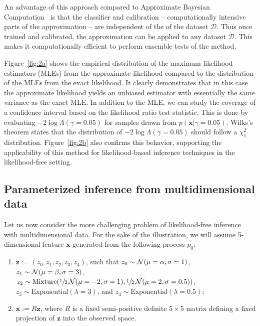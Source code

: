 \documentclass[12pt]{article}
\numberwithin{equation}{section}
\theoremstyle{plain}
\begin{document}
An advantage of this approach compared to Approximate Bayesian Computation~\citep{beaumont2002approximate} is that the
classifier and calibration -- computationally intensive
parts of the approximation  -- are independent of the of the dataset $\mathcal{D}$.
Thus once trained and calibrated, the approximation can be applied to any dataset $\mathcal{D}$.
This makes it computationally efficient to perform ensemble tests of the method.

Figure~\ref{fig:2a} shows the empirical distribution of the maximum likelihood estimators (MLEs) from the
approximate likelihood compared to the distribution of the MLEs from the exact likelihood.
It clearly demonstrates that in this case the approximate likelihood yields an unbiased estimator with essentially the same variance as the exact MLE.
In addition to the MLE, we can study the coverage of a confidence interval based on the likelihood ratio test statistic.
This is done by evaluating $-2\log \Lambda(\gamma=0.05)$ for samples drawn from $p(\mathbf{x} | \gamma=0.05)$.
Wilks's theorem states that the distribution of $-2\log \Lambda(\gamma=0.05)$ should follow a $\chi^2_1$ distribution.
%
Figure~\ref{fig:2b} also confirms this behavior, supporting the applicability of this method for likelihood-based inference techniques in the likelihood-free setting.




\subsection{Parameterized inference from multidimensional data}

Let us now consider the more challenging problem of likelihood-free
inference with multidimensional data.
For the sake of the illustration, we will assume 5-dimensional feature $\mathbf{x}$ generated
from the following process $p_0$:
    \begin{enumerate}
        \item $\mathbf{z} := (z_0, z_1, z_2, z_3, z_4)$, such that
            $z_0 \sim {\cal N}(\mu=\alpha, \sigma=1)$,
            $z_1 \sim {\cal N}(\mu=\beta, \sigma=3)$,
            $z_2 \sim {\text{Mixture}}(\sfrac{1}{2}\,{\cal N}(\mu=-2, \sigma=1), \sfrac{1}{2}\,{\cal N}(\mu=2, \sigma=0.5))$,
            $z_3 \sim {\text{Exponential}(\lambda=3)}$, and
            $z_4 \sim {\text{Exponential}(\lambda=0.5)}$;
        \item $\mathbf{x} := R  \mathbf{z}$, where $R$ is a fixed
        semi-positive definite $5 \times 5$ matrix defining a fixed projection
        of $\mathbf{z}$ into the observed space.
    \end{enumerate}
\end{document}
